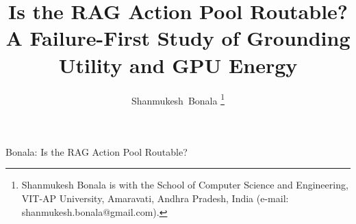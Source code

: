 \title{Is the RAG Action Pool Routable? A Failure-First Study of Grounding Utility and GPU Energy}

\author{Shanmukesh~Bonala%
\thanks{Shanmukesh Bonala is with the School of Computer Science and Engineering,
VIT-AP University, Amaravati, Andhra Pradesh, India
(e-mail: shanmukesh.bonala@gmail.com).}%
}

%
{Bonala: Is the RAG Action Pool Routable?}
